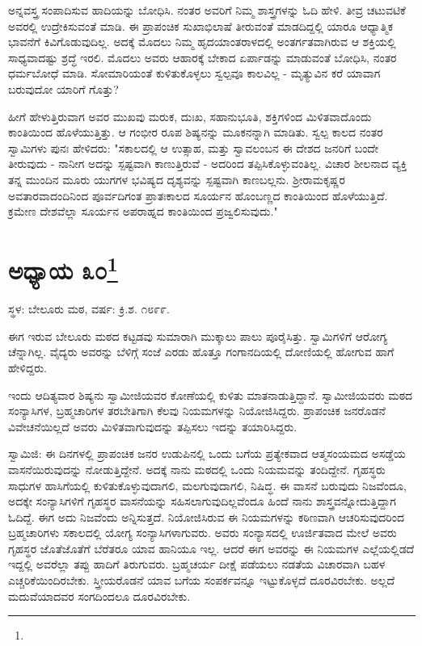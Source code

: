 ಅನ್ನವಸ್ತ್ರ ಸಂಪಾದಿಸುವ ಹಾದಿಯನ್ನು ಬೋಧಿಸಿ. ನಂತರ ಅವರಿಗೆ ನಿಮ್ಮ ಶಾಸ್ತ್ರಗಳನ್ನು ಓದಿ ಹೇಳಿ. ತೀವ್ರ ಚಟುವಟಿಕೆ ಅವರಲ್ಲಿ ಉದ್ರೇಕಿಸುವಂತೆ ಮಾಡಿ. ಈ ಪ್ರಾಪಂಚಿಕ ಸುಖಾಭಿಲಾಷೆ ತೀರುವಂತೆ ಮಾಡದಿದ್ದಲ್ಲಿ ಯಾರೂ ಆಧ್ಯಾತ್ಮಿಕ ಭಾವನೆಗೆ ಕಿವಿಗೊಡುವುದಿಲ್ಲ. ಅದಕ್ಕೆ ಮೊದಲು ನಿಮ್ಮ ಹೃದಯಾಂತರಾಳದಲ್ಲಿ ಅಂತರ್ಗತವಾಗಿರುವ ಆ ಶಕ್ತಿಯಲ್ಲಿ ಸಾಧ್ಯವಾದಷ್ಟು ಶ್ರದ್ಧೆ ಇರಲಿ. ಮೊದಲು ಅವರು ಆಹಾರಕ್ಕೆ ಬೇಕಾದ ಏರ್ಪಾಡನ್ನು ಮಾಡುವಂತೆ ಬೋಧಿಸಿ, ನಂತರ ಧರ್ಮಬೋಧೆ ಮಾಡಿ. ಸೋಮಾರಿಯಂತೆ ಕುಳಿತುಕೊಳ್ಳಲು ಸ್ವಲ್ಪವೂ ಕಾಲವಿಲ್ಲ - ಮೃತ್ಯುವಿನ ಕರೆ ಯಾವಾಗ ಬರುವುದೋ ಯಾರಿಗೆ ಗೊತ್ತು?

ಹೀಗೆ ಹೇಳುತ್ತಿರುವಾಗ ಅವರ ಮುಖವು ಮರುಕ, ದುಃಖ, ಸಹಾನುಭೂತಿ, ಶಕ್ತಿಗಳಿಂದ ಮಿಳಿತವಾದೊಂದು ಕಾಂತಿಯಿಂದ ಹೊಳೆಯುತ್ತಿತ್ತು. ಆ ಗಂಭೀರ ರೂಪ ಶಿಷ್ಯನನ್ನು ಮೂಕನನ್ನಾಗಿ ಮಾಡಿತು. ಸ್ವಲ್ಪ ಕಾಲದ ನಂತರ ಸ್ವಾಮಿಗಳು ಪುನಃ ಹೇಳಿದರು: "ಸಕಾಲದಲ್ಲಿ ಆ ಉತ್ಸಾಹ, ಮತ್ತು ಸ್ವಾವಲಂಬನ ಈ ದೇಶದ ಜನರಿಗೆ ಬಂದೇ ತೀರುವುದು - ನಾನೀಗ ಅದನ್ನು ಸ್ಪಷ್ಟವಾಗಿ ಕಾಣುತ್ತಿರುವೆ - ಅದರಿಂದ ತಪ್ಪಿಸಿಕೊಳ್ಳುವಂತಿಲ್ಲ. ವಿಚಾರ ಶೀಲನಾದ ವ್ಯಕ್ತಿ ತನ್ನ ಮುಂದಿನ ಮೂರು ಯುಗಗಳ ಭವಿಷ್ಯದ ದೃಶ್ಯವನ್ನು ಸ್ಪಷ್ಟವಾಗಿ ಕಾಣಬಲ್ಲನು. ಶ‍್ರೀರಾಮಕೃಷ್ಣರ ಅವತಾರವಾದಂದಿನಿಂದ ಪೂರ್ವದಿಗಂತ ಪ್ರಾತಃಕಾಲದ ಸೂರ್ಯನ ಹೊಂಬಣ್ಣದ ಕಾಂತಿಯಿಂದ ಹೊಳೆಯುತ್ತಿದೆ. ಕ್ರಮೇಣ ದೇಶವೆಲ್ಲಾ ಸೂರ್ಯನ ಅಪರಾಹ್ನದ ಕಾಂತಿಯಿಂದ ಪ್ರಜ್ವಲಿಸುವುದು."

\newpage

\chapter[ಅಧ್ಯಾಯ ೩೦]{ಅಧ್ಯಾಯ ೩೦\protect\footnote{}}

\begin{center}
ಸ್ಥಳ: ಬೇಲೂರು ಮಠ, ವರ್ಷ: ಕ್ರಿ.ಶ. ೧೮೯೯.
\end{center}

ಈಗ ಇರುವ ಬೇಲೂರು ಮಠದ ಕಟ್ಟಡವು ಸುಮಾರಾಗಿ ಮುಕ್ಕಾಲು ಪಾಲು ಪೂರೈಸಿತ್ತು. ಸ್ವಾಮಿಗಳಿಗೆ ಆರೋಗ್ಯ ಚೆನ್ನಾಗಿಲ್ಲ. ವೈದ್ಯರು ಅವರನ್ನು ಬೆಳಿಗ್ಗೆ ಸಂಜೆ ಎರಡು ಹೊತ್ತೂ ಗಂಗಾನದಿಯಲ್ಲಿ ದೋಣಿಯಲ್ಲಿ ಹೋಗುವ ಹಾಗೆ ಹೇಳಿದ್ದರು.

ಇಂದು ಆದಿತ್ಯವಾರ ಶಿಷ್ಯನು ಸ್ವಾಮೀಜಿಯವರ ಕೋಣೆಯಲ್ಲಿ ಕುಳಿತು ಮಾತನಾಡುತ್ತಿದ್ದಾನೆ. ಸ್ವಾಮೀಜಿಯವರು ಮಠದ ಸಂನ್ಯಾಸಿಗಳ, ಬ್ರಹ್ಮಚಾರಿಗಳ ತರಬೇತಿಗಾಗಿ ಕೆಲವು ನಿಯಮಗಳನ್ನು ನಿಯೋಜಿಸಿದ್ದರು. ಪ್ರಾಪಂಚಿಕ ಜನರೊಡನೆ ವಿವೇಚನೆಯಿಲ್ಲದೆ ಅವರು ಮಿಳಿತವಾಗುವುದನ್ನು ತಪ್ಪಿಸಲು ಇದನ್ನು ತಯಾರಿಸಿದ್ದರು.

ಸ್ವಾಮಿಜಿ: ಈ ದಿನಗಳಲ್ಲಿ ಪ್ರಾಪಂಚಿಕ ಜನರ ಉಡುಪಿನಲ್ಲಿ ಒಂದು ಬಗೆಯ ಪ್ರತ್ಯೇಕವಾದ ಆತ್ಮಸಂಯಮದ ಅಸಡ್ಡೆಯ ವಾಸನೆಯಿರುವುದನ್ನು ನೋಡುತ್ತಿದ್ದೇನೆ. ಅದಕ್ಕೆ ನಾನು ಮಠದಲ್ಲಿ ಒಂದು ನಿಯಮವನ್ನು ತಂದಿದ್ದೇನೆ. ಗೃಹಸ್ಥರು ಸಾಧುಗಳ ಹಾಸಿಗೆಯಲ್ಲಿ ಕುಳಿತುಕೊಳ್ಳುವುದಾಗಲಿ, ಮಲಗುವುದಾಗಲಿ, ನಿಷಿದ್ಧ. ಈ ವಾಸನೆ ಬರುವುದು ನಿಜವೆಂದೂ, ಅದಕ್ಕೇ ಸಂನ್ಯಾಸಿಗಳಿಗೆ ಗೃಹಸ್ಥರ ವಾಸನೆಯನ್ನು ಸಹಿಸಲಾಗುವುದಿಲ್ಲವೆಂದೂ ಹಿಂದೆ ನಾನು ಶಾಸ್ತ್ರವನ್ನೋದುತ್ತಿದ್ದಾಗ ಓದಿದ್ದೆ. ಈಗ ಅದು ನಿಜವೆಂದು ಅನ್ನಿಸುತ್ತದೆ. ನಿಯೋಜಿಸಿರುವ ಈ ನಿಯಮಗಳನ್ನು ಕಠಿಣವಾಗಿ ಆಚರಿಸುವುದರಿಂದ ಬ್ರಹ್ಮಚಾರಿಗಳು ಸಕಾಲದಲ್ಲಿ ಯೋಗ್ಯ ಸಂನ್ಯಾಸಿಗಳಾಗುವರು. ಅವರು ಸಂನ್ಯಾಸದಲ್ಲಿ ಊರ್ಜಿತವಾದ ಮೇಲೆ ಅವರು ಗೃಹಸ್ಥರ ಜೊತೆಜೊತೆಗೆ ಬೆರೆತರೂ ಯಾವ ಹಾನಿಯೂ ಇಲ್ಲ. ಆದರೆ ಈಗ ಅವರನ್ನು ಈ ನಿಯಮಗಳ ಎಲ್ಲೆಯಲ್ಲಿಡದೆ ಇದ್ದಲ್ಲಿ ಅವರೆಲ್ಲಾ ತಪ್ಪು ಹಾದಿಗೆ ತಿರುಗುವರು. ಬ್ರಹ್ಮಚರ್ಯ ದೀಕ್ಷೆ ಪಡೆಯಲು ನಡತೆಯ ವಿಚಾರವಾಗಿ ಬಹಳ ಎಚ್ಚರಿಕೆಯಿಂದಿರಬೇಕು. ಸ್ತ್ರೀಯರೊಡನೆ ಯಾವ ಬಗೆಯ ಸಂಪರ್ಕವನ್ನೂ ಇಟ್ಟುಕೊಳ್ಳದೆ ದೂರವಿರಬೇಕು. ಅಲ್ಲದೆ ಮದುವೆಯಾದವರ ಸಂಗದಿಂದಲೂ ದೂರವಿರಬೇಕು.

